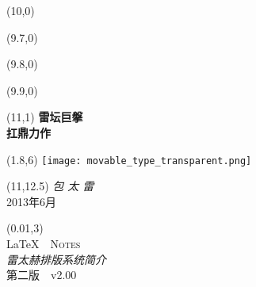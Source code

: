 \begin{titlepage}

\setlength\parindent{0pt}


\begin{textblock}{6}(10,0)
    \rule{0mm}{420mm}
\end{textblock}

\begin{textblock}{.02}(9.7,0)
    \rule{0mm}{420mm}
\end{textblock}

\begin{textblock}{.02}(9.8,0)
    \rule{0mm}{420mm}
\end{textblock}

\begin{textblock}{.02}(9.9,0)
    \rule{0mm}{420mm}
\end{textblock}

\begin{textblock}{3}(11,1)
    {\Huge \textbf{雷坛巨搫}\\[5pt] \textbf{扛鼎力作}}
\end{textblock}

\begin{textblock}{12}(1.8,6)
\textblockcolour{}
    \texttt{[image: movable\_type\_transparent.png]}
\end{textblock}

\begin{textblock}{4}(11,12.5)
    {\huge \textit{包 太 雷}}\\[5pt]
    {\Large 2013年6月}
\end{textblock}

\TPshowboxestrue
\setlength\TPboxrulesize{0.8pt}

\begin{textblock}{14}(0.01,3)
    \centering
    ~\\[20pt]
    {\fontsize{32}{40}\selectfont \LaTeX\ \ \textsc{Notes}}\\[8pt]
    {\huge \textit{雷太赫排版系统简介}}\\[8pt]
    第二版\ \ v2.00\\[20pt]
\end{textblock}
~
\end{titlepage}

\newpage
\thispagestyle{empty}
~

